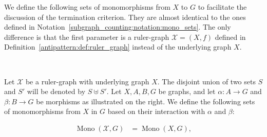 We define the following sets of monomorphisms from $X$ to $G$ to facilitate the discussion of the termination criterion. They are almost identical to the ones defined in Notation~\ref{subgraph_counting:notation:mono_sets}. The only difference is that the first parameter is a ruler-graph $\mathcal{X}=(X,f)$ defined in Definition~\ref{antipattern:def:ruler_graph} instead of the underlying graph $X$.
\begin{notation}
    \label{antipattern:notation:mono_sets}
     \ \newline
\noindent
\begin{minipage}{0.69\textwidth}
\vspace{2mm}
\noindent 
  Let \( \mathcal{X}\) be a ruler-graph with underlying graph $X$. The disjoint union of two sets \( S \) and \( S' \) will be denoted by \( S \uplus S' \). Let \( X, A, B, G \) be graphs, and let \( \alpha \colon A \to G \) and \( \beta \colon B \to G \) be morphisms as illustrated on the right. We define the following sets of monomorphisms from $X$ in $G$ based on their interaction with $\alpha$ and $\beta$:    
\end{minipage}%
\begin{minipage}{0.30\textwidth}
    \hfill
\end{minipage} 
    \begin{align*}
        \operatorname{Mono}(\mathcal{X},G) &= \operatorname{Mono}(X,G), 

\end{align*}
\end{notation}
